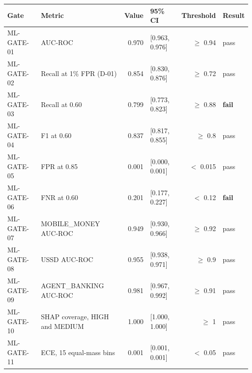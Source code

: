 \begin{tabular}{llrlrl}
\toprule
Gate & Metric & Value & 95\% CI & Threshold & Result \\
\midrule
ML-GATE-01 & AUC-ROC & 0.970 & [0.963, 0.976] & $\geq$ 0.94 & pass \\
ML-GATE-02 & Recall at 1\% FPR (D-01) & 0.854 & [0.830, 0.876] & $\geq$ 0.72 & pass \\
ML-GATE-03 & Recall at 0.60 & 0.799 & [0.773, 0.823] & $\geq$ 0.88 & \textbf{fail} \\
ML-GATE-04 & F1 at 0.60 & 0.837 & [0.817, 0.855] & $\geq$ 0.8 & pass \\
ML-GATE-05 & FPR at 0.85 & 0.001 & [0.000, 0.001] & $<$ 0.015 & pass \\
ML-GATE-06 & FNR at 0.60 & 0.201 & [0.177, 0.227] & $<$ 0.12 & \textbf{fail} \\
ML-GATE-07 & MOBILE_MONEY AUC-ROC & 0.949 & [0.930, 0.966] & $\geq$ 0.92 & pass \\
ML-GATE-08 & USSD AUC-ROC & 0.955 & [0.938, 0.971] & $\geq$ 0.9 & pass \\
ML-GATE-09 & AGENT_BANKING AUC-ROC & 0.981 & [0.967, 0.992] & $\geq$ 0.91 & pass \\
ML-GATE-10 & SHAP coverage, HIGH and MEDIUM & 1.000 & [1.000, 1.000] & $\geq$ 1 & pass \\
ML-GATE-11 & ECE, 15 equal-mass bins & 0.001 & [0.001, 0.001] & $<$ 0.05 & pass \\
\bottomrule
\end{tabular}
